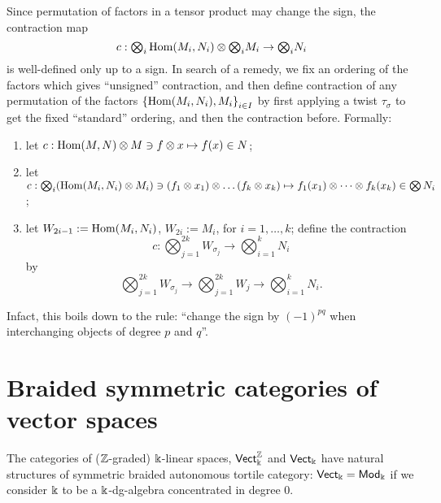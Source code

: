 Since permutation of factors in a tensor product may change the sign,
the contraction map 
\begin{equation*}
c: {\textstyle \bigotimes_i} \Hom(M_i, N_i) \otimes
 {\textstyle \bigotimes_i} M_i \to  {\textstyle \bigotimes_i} N_i
\end{equation*}
is well-defined only up to a sign. In search of a remedy, we fix an
ordering of the factors which gives ``unsigned'' contraction, and then
define contraction of any permutation of the factors
$\left\{\Hom(M_i,N_i), M_i\right\}_{i\in I}$ by first applying a
twist $\tau_\sigma$ to get the fixed ``standard'' ordering, and then the
contraction before. Formally:
\begin{enumerate}
\item let $c: \Hom(M,N) \otimes M \ni f\otimes x \mapsto f(x) \in N$;
\item let $c: \bigotimes_i (\Hom(M_i, N_i) \otimes M_i) \ni (f_1\otimes x_1)
  \otimes \dots (f_k\otimes x_k) \mapsto f_1(x_1) \otimes \dots
  \otimes f_k(x_k) \in \bigotimes N_i$;
\item let $W_{2i-1} := \Hom(M_i, N_i)$, $W_{2i} := M_i$, for $i =
  1, \dots, k$; define the contraction
  \begin{equation*}
    c: {\textstyle \bigotimes_{j=1}^{2k}} W_{\sigma_j} \to
    {\textstyle \bigotimes_{i=1}^k} N_i
  \end{equation*}
  by 
  \begin{equation*}
    {\textstyle \bigotimes_{j=1}^{2k}} W_{\sigma_j} \to {\textstyle \bigotimes_{j=1}^{2k}} W_j \to
    {\textstyle \bigotimes_{i=1}^{k}} N_i.
  \end{equation*}
\end{enumerate}

Infact, this boils down to the rule: ``change the sign by
$(-1)^{pq}$ when interchanging objects of degree $p$ and $q$''.


\section{Braided symmetric categories of vector spaces}
\label{sec:btc-vect}

The categories of ($\setZ$-graded) $\fk$-linear spaces, $\catVect[\fk]^\setZ$
and $\catVect[\fk]$ have natural structures of symmetric braided
autonomous tortile category: $\catVect[\fk] = \catMod_\fk$ if we
consider $\fk$ to be a $\fk$-dg-algebra concentrated in degree $0$.

